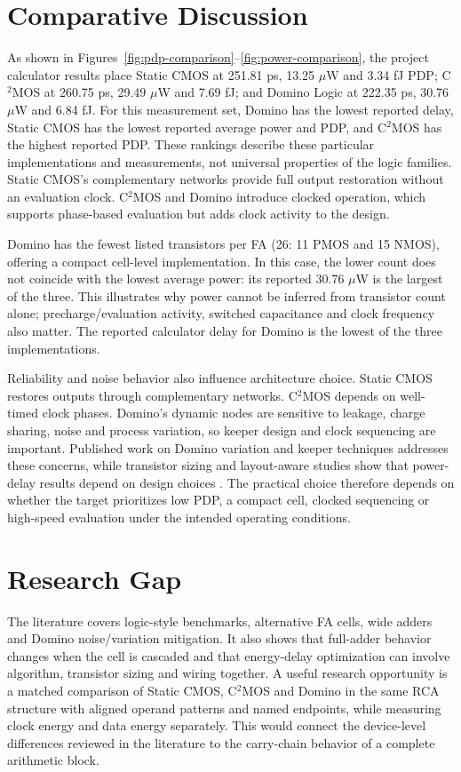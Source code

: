\documentclass[11pt,a4paper]{article}
\begin{document}
\section{Comparative Discussion}
As shown in Figures~\ref{fig:pdp-comparison}--\ref{fig:power-comparison}, the project calculator results place Static CMOS at 251.81 ps, 13.25 $\mu$W and 3.34 fJ PDP; C$^{2}$MOS at 260.75 ps, 29.49 $\mu$W and 7.69 fJ; and Domino Logic at 222.35 ps, 30.76 $\mu$W and 6.84 fJ. For this measurement set, Domino has the lowest reported delay, Static CMOS has the lowest reported average power and PDP, and C$^{2}$MOS has the highest reported PDP. These rankings describe these particular implementations and measurements, not universal properties of the logic families. Static CMOS's complementary networks provide full output restoration without an evaluation clock. C$^{2}$MOS and Domino introduce clocked operation, which supports phase-based evaluation but adds clock activity to the design.

Domino has the fewest listed transistors per FA (26: 11 PMOS and 15 NMOS), offering a compact cell-level implementation. In this case, the lower count does not coincide with the lowest average power: its reported 30.76 $\mu$W is the largest of the three. This illustrates why power cannot be inferred from transistor count alone; precharge/evaluation activity, switched capacitance and clock frequency also matter. The reported calculator delay for Domino is the lowest of the three implementations.

Reliability and noise behavior also influence architecture choice. Static CMOS restores outputs through complementary networks. C$^{2}$MOS depends on well-timed clock phases. Domino's dynamic nodes are sensitive to leakage, charge sharing, noise and process variation, so keeper design and clock sequencing are important. Published work on Domino variation and keeper techniques addresses these concerns, while transistor sizing and layout-aware studies show that power-delay results depend on design choices \cite{Alioto2008,Alioto2002,Zeydel2010,Garg2018}. The practical choice therefore depends on whether the target prioritizes low PDP, a compact cell, clocked sequencing or high-speed evaluation under the intended operating conditions.

\section{Research Gap}
The literature covers logic-style benchmarks, alternative FA cells, wide adders and Domino noise/variation mitigation. It also shows that full-adder behavior changes when the cell is cascaded and that energy-delay optimization can involve algorithm, transistor sizing and wiring together. A useful research opportunity is a matched comparison of Static CMOS, C$^{2}$MOS and Domino in the same RCA structure with aligned operand patterns and named endpoints, while measuring clock energy and data energy separately. This would connect the device-level differences reviewed in the literature to the carry-chain behavior of a complete arithmetic block.
\end{document}
